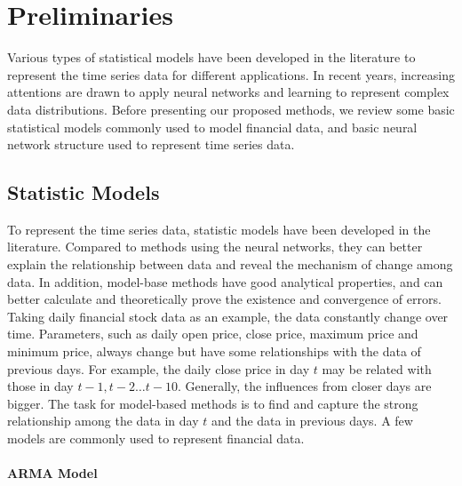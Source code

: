 \section{Preliminaries}
Various types of statistical models have been developed in the literature to represent the time series data for different applications. In recent years, increasing attentions are drawn to apply neural networks and  learning to represent complex data distributions. Before presenting our proposed methods, we review some basic statistical models commonly used to model financial data, and basic neural network structure  used to represent time series data. 

\subsection{Statistic Models}
To represent the time series data, statistic models have been developed in the literature. Compared to methods using the neural networks, they can better explain the relationship between data and reveal the mechanism of change among data. In addition, model-base methods have good analytical properties, and can better calculate and theoretically prove the existence and convergence of errors. Taking daily financial stock data as an example, the data constantly change over time. Parameters, such as daily open price, close price, maximum price and minimum price, always change but have some relationships with the data of previous days. For example, the daily close price in day $t$ may be related with those in day $t-1, t-2…t-10$. Generally, the influences from closer days are bigger.  The task for model-based methods is to find and capture the strong relationship among the data in day $t$ and the data in previous days. A few models are commonly used to represent financial data. 

\paragraph{ARMA Model}


